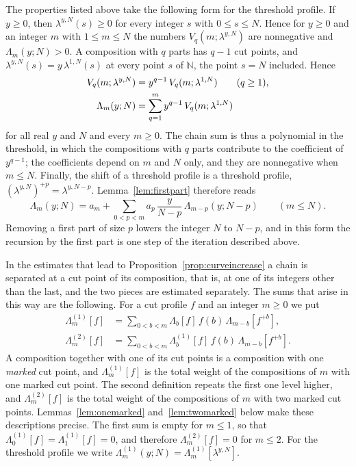 \documentclass{amsart}
\makeatletter
\theoremstyle{definition}
\theoremstyle{remark}
\numberwithin{equation}{section}
\def\subsection{\@startsection{subsection}{2}\z@{.5\linespacing\@plus.7\linespacing}{-.5em}{\normalfont\bfseries\boldmath}}
\makeatother
\begin{document}
The properties listed above take the following form for the threshold
profile. If $y\ge0$, then $\lambda^{y,N}(s)\ge0$ for every integer $s$ with
$0\le s\le N$. Hence
for $y\ge0$ and an integer $m$ with $1\le m\le N$ the numbers
$V_q(m;\lambda^{y,N})$ are nonnegative and $\Lambda_m(y;N)>0$.
A composition with $q$ parts has $q-1$ cut points, and
$\lambda^{y,N}(s)=y\,\lambda^{1,N}(s)$ at every point $s$ of
$\mathbb N$, the point $s=N$ included. Hence
\begin{align}
V_q(m;\lambda^{y,N})&=y^{q-1}\,V_q(m;\lambda^{1,N})\qquad(q\ge1),
\label{eq:compositions-homogeneity}\\
\Lambda_m(y;N)&=\sum_{q=1}^{m}y^{q-1}\,V_q(m;\lambda^{1,N})\notag
\end{align}
for all real $y$ and $N$ and every $m\ge0$. The chain sum is thus a
polynomial in the threshold, in which the compositions with $q$ parts
contribute to the coefficient of $y^{q-1}$; the coefficients depend on $m$
and $N$ only, and they are nonnegative when $m\le N$. Finally, the shift of
a threshold profile is a threshold profile,
$(\lambda^{y,N})^{+p}=\lambda^{y,N-p}$. Lemma~\ref{lem:firstpart} therefore
reads
\[
\Lambda_m(y;N)=a_m+\sum_{0<p<m}a_p\,\frac{y}{N-p}\,\Lambda_{m-p}(y;N-p)
\qquad(m\le N).
\]
Removing a first part of size $p$ lowers the integer $N$ to $N-p$, and in
this form the recursion by the first part is one step of the iteration
described above.

\subsection{Marked cut points}\label{subsec:compositions-marked}

In the estimates that lead to Proposition~\ref{prop:curveincrease} a chain
is separated at a cut point of its composition, that is, at one of its
integers other than the last, and the two pieces are estimated separately.
The sums that arise in this way are the following.
For a cut profile $f$ and an integer $m\ge0$ we put
\begin{align*}
\Lambda^{(1)}_m[f]&=\sum_{0<b<m}\Lambda_b[f]\,f(b)\,\Lambda_{m-b}[f^{+b}],\\
\Lambda^{(2)}_m[f]&=\sum_{0<b<m}\Lambda^{(1)}_b[f]\,f(b)\,\Lambda_{m-b}[f^{+b}].
\end{align*}
A composition together with one of its cut points is a composition with one
\emph{marked} cut point, and $\Lambda^{(1)}_m[f]$ is the total weight of
the compositions of $m$ with one marked cut point. The second definition
repeats the first one level higher, and $\Lambda^{(2)}_m[f]$ is the total
weight of the compositions of $m$ with two marked cut points. Lemmas~\ref{lem:onemarked}
and~\ref{lem:twomarked} below make these descriptions precise. The first sum
is empty for $m\le1$, so that
$\Lambda^{(1)}_0[f]=\Lambda^{(1)}_1[f]=0$, and therefore
$\Lambda^{(2)}_m[f]=0$ for $m\le2$. For the threshold profile we write
$\Lambda^{(1)}_m(y;N)=\Lambda^{(1)}_m[\lambda^{y,N}]$.
\end{document}
